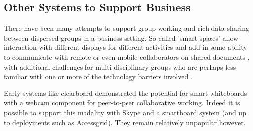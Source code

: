 \subsection{Other Systems to Support Business}                  
There have been many attempts to support group working and rich data sharing between dispersed groups in a business setting. So called 'smart spaces' allow interaction with different displays for different activities and add in some ability to communicate with remote or even mobile collaborators on shared documents \cite{Bardram2012}, with additional challenges for multi-disciplinary groups who are perhaps less familiar with one or more of the technology barriers involved \cite{Adamczyk2007}.\par
Early systems like clearboard \cite{Ishii1993} demonstrated the potential for smart whiteboards with a webcam component for peer-to-peer collaborative working. Indeed it is possible to support this modality with Skype and a smartboard system (and up to deployments such as Accessgrid). They remain relatively unpopular however.\par

